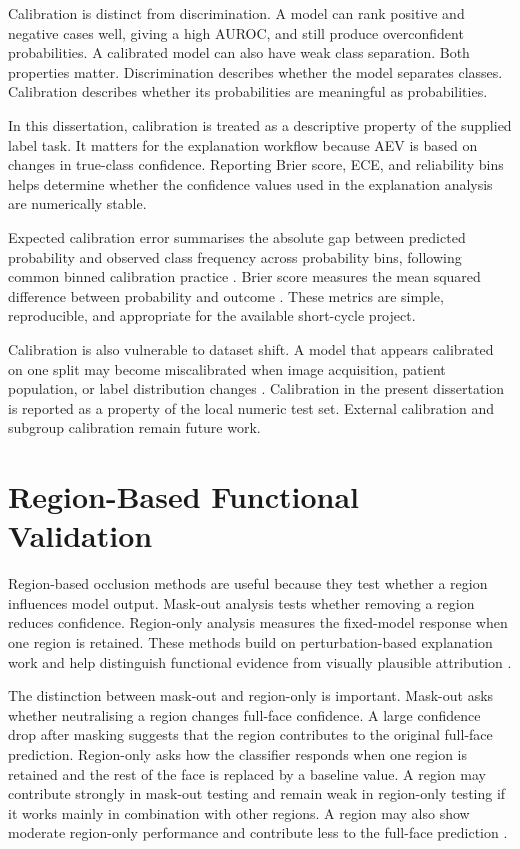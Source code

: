 Calibration is distinct from discrimination. A model can rank positive and negative cases well, giving a high AUROC, and still produce overconfident probabilities. A calibrated model can also have weak class separation. Both properties matter. Discrimination describes whether the model separates classes. Calibration describes whether its probabilities are meaningful as probabilities.


In this dissertation, calibration is treated as a descriptive property of the supplied label task. It matters for the explanation workflow because AEV is based on changes in true-class confidence. Reporting Brier score, ECE, and reliability bins helps determine whether the confidence values used in the explanation analysis are numerically stable.


Expected calibration error summarises the absolute gap between predicted probability and observed class frequency across probability bins, following common binned calibration practice  . Brier score measures the mean squared difference between probability and outcome . These metrics are simple, reproducible, and appropriate for the available short-cycle project.


Calibration is also vulnerable to dataset shift. A model that appears calibrated on one split may become miscalibrated when image acquisition, patient population, or label distribution changes  . Calibration in the present dissertation is reported as a property of the local numeric test set. External calibration and subgroup calibration remain future work.


\section{Region-Based Functional Validation}

Region-based occlusion methods are useful because they test whether a region influences model output. Mask-out analysis tests whether removing a region reduces confidence. Region-only analysis measures the fixed-model response when one region is retained. These methods build on perturbation-based explanation work and help distinguish functional evidence from visually plausible attribution   .


The distinction between mask-out and region-only is important. Mask-out asks whether neutralising a region changes full-face confidence. A large confidence drop after masking suggests that the region contributes to the original full-face prediction. Region-only asks how the classifier responds when one region is retained and the rest of the face is replaced by a baseline value. A region may contribute strongly in mask-out testing and remain weak in region-only testing if it works mainly in combination with other regions. A region may also show moderate region-only performance and contribute less to the full-face prediction  .


